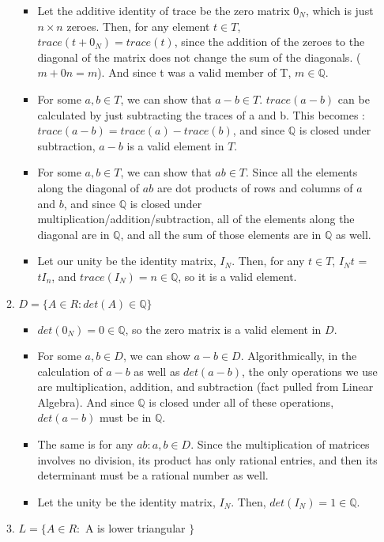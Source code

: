 \begin{enumerate}
\begin{enumerate}
      \begin{itemize}
        \item Let the additive identity of trace be the zero matrix $0_N$, which is just $n \times n$ zeroes. Then, for any element $t \in T$, $trace(t + 0_N) = trace(t)$, since the addition of the zeroes to the diagonal of the matrix does not change the sum of the diagonals. ($m + 0n = m$). And since t was a valid member of T, $m \in \mathds{Q}$.
        \item For some $a,b \in T$, we can show that $a-b \in T$. $trace(a-b)$ can be calculated by just subtracting the traces of a and b. This becomes : $trace(a-b) = trace(a) - trace(b)$, and since $\mathds{Q}$ is closed under subtraction, $a-b$ is a valid element in $T$.
        \item For some $a,b \in T$, we can show that $ab \in T$. Since all the elements along the diagonal of $ab$ are dot products of rows and columns of $a$ and $b$, and since $\mathds{Q}$ is closed under multiplication/addition/subtraction, all of the elements along the diagonal are in $\mathds{Q}$, and all the sum of those elements are in $\mathds{Q}$ as well.
        \item Let our unity be the identity matrix, $I_N$. Then, for any $t \in T$, $I_Nt$ = $tI_n$, and $trace(I_N) = n \in \mathds{Q}$, so it is a valid element.
      \end{itemize}
    \item $D = \{A \in R : det(A)   \in \mathds{Q}\}$
      \begin{itemize}
        \item $det(0_N) = 0 \in \mathds{Q}$, so the zero matrix is a valid element in $D$.
        \item For some $a,b \in D$, we can show $a-b \in D$. Algorithmically, in the calculation of $a-b$ as well as $det(a-b)$, the only operations we use are multiplication, addition, and subtraction (fact pulled from Linear Algebra). And since $\mathds{Q}$ is closed under all of these operations, $det(a-b)$ must be in $\mathds{Q}$.
        \item The same is for any $ab : a,b \in D$. Since the multiplication of matrices involves no division, its product has only rational entries, and then its determinant must be a rational number as well.
        \item Let the unity be the identity matrix, $I_N$. Then, $det(I_N) = 1 \in \mathds{Q}$.
      \end{itemize}
    \item $L = \{A \in R : $ A is lower triangular $\}$

\end{enumerate}
\end{enumerate}
